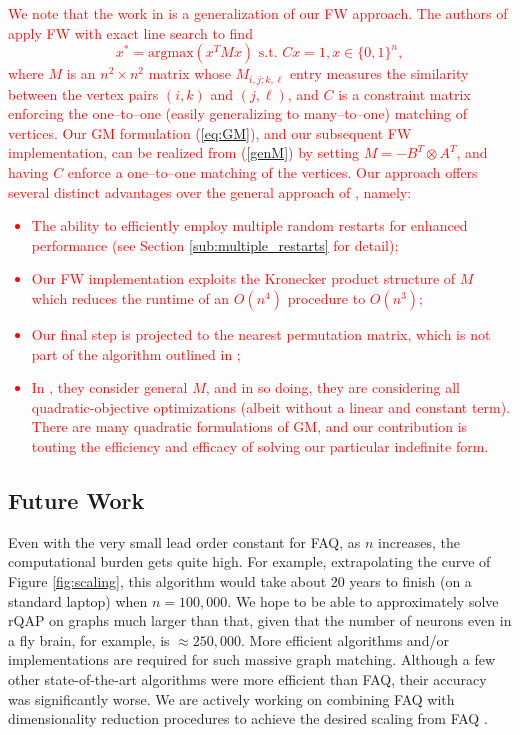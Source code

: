 \documentclass[10pt]{article}
\begin{document}
\textcolor{red}{We note that the work in \cite{otherFW} is a generalization of our FW approach.  The authors of \cite{otherFW} apply FW with exact line search to find
\begin{equation}
\label{genM}
x^* = \text{argmax}(x
^TMx) \text{ s.t. } Cx = 1, x \in \{0, 1\}^
n,
\end{equation}
where $M$ is an $n^2\times n^2$ matrix whose $M_{i,j;k,\ell}$ entry measures the similarity between the vertex pairs $(i, k)$ and $(j, \ell)$, and $C$ is a constraint matrix enforcing the one--to--one (easily generalizing to many--to--one) matching of vertices.  Our GM formulation (\ref{eq:GM}), and our subsequent FW implementation, can be realized from (\ref{genM}) by setting $M=-B^T\otimes A^T$, and having $C$ enforce a one--to--one matching of the vertices.
Our approach offers several distinct advantages over the general approach of \cite{otherFW}, namely:
\begin{itemize}
\item  The ability to efficiently employ multiple random restarts for enhanced performance (see Section \ref{sub:multiple_restarts} for detail);
\item  Our FW implementation exploits the Kronecker product structure of $M$ which
reduces the runtime of an $O(n^4)$ procedure to $O(n^3)$;
\item  Our final step is projected to the nearest permutation matrix, which is not  part of the algorithm outlined in \cite{otherFW};
\item In \cite{otherFW}, they consider general $M$, and in so doing, they are considering all quadratic-objective optimizations (albeit without a linear and constant term).  There are many quadratic formulations of GM, and our contribution is touting the efficiency and efficacy of solving our particular indefinite form.
\end{itemize}}



\subsection{Future Work}

Even with the very small lead order constant for FAQ, as $n$ increases, the computational burden gets quite high.  For example, extrapolating the curve of Figure \ref{fig:scaling}, this algorithm would take about 20 years to finish (on a standard laptop) when $n=100,000$.  We hope to be able to approximately solve rQAP on graphs much larger than that, given that the number of neurons even in a fly brain, for example, is $\approx 250,000$.  More efficient algorithms and/or implementations are required for such massive graph matching. Although a few other state-of-the-art algorithms were more efficient than FAQ, their accuracy was significantly worse.  We are actively working on combining FAQ with dimensionality reduction procedures to achieve the desired scaling from FAQ \cite{Lyzinski2013}.
\end{document}
